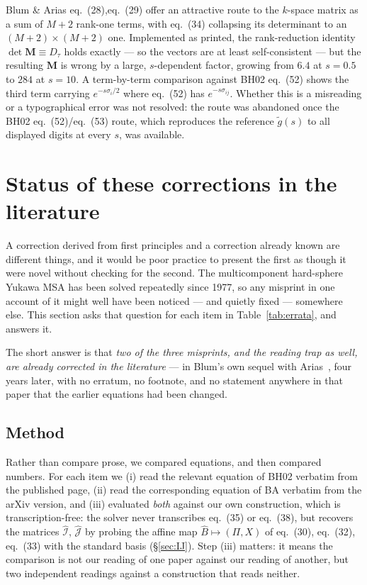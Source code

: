 \documentclass[11pt,a4paper]{article}
\newcommand{\eqBH}[1]{eq.~(#1)}
\begin{document}
Blum \& Arias \eqBH{28},\eqBH{29} offer an attractive route to the $k$-space
matrix as a sum of $M+2$ rank-one terms, with \eqBH{34} collapsing its
determinant to an $(M{+}2)\times(M{+}2)$ one. Implemented as printed, the
rank-reduction identity $\det\bm M\equiv D_\tau$ holds exactly --- so the
vectors are at least self-consistent --- but the resulting $\bm M$ is wrong by
a large, $s$-dependent factor, growing from $6.4$ at $s=0.5$ to $284$ at
$s=10$. A term-by-term comparison against BH02 \eqBH{52} shows the third term
carrying $e^{-s\sigma_i/2}$ where \eqBH{52} has $e^{-s\sigma_{ij}}$. Whether
this is a misreading or a typographical error was not resolved: the route was
abandoned once the BH02 \eqBH{52}/\eqBH{53} route, which reproduces the
reference $\tilde g(s)$ to all displayed digits at every $s$, was available.

\section{Status of these corrections in the literature}
\label{sec:literature}

A correction derived from first principles and a correction already known are
different things, and it would be poor practice to present the first as though
it were novel without checking for the second. The multicomponent hard-sphere
Yukawa MSA has been solved repeatedly since 1977, so any misprint in one
account of it might well have been noticed --- and quietly fixed --- somewhere
else. This section asks that question for each item in
Table~\ref{tab:errata}, and answers it.

The short answer is that \emph{two of the three misprints, and the reading trap
as well, are already corrected in the literature} --- in Blum's own sequel with
Arias~\cite{BlumArias}, four years later, with no erratum, no footnote, and no
statement anywhere in that paper that the earlier equations had been changed.

\subsection{Method}

Rather than compare prose, we compared equations, and then compared numbers.
For each item we (i) read the relevant equation of BH02 verbatim from the
published page, (ii) read the corresponding equation of BA verbatim from the
arXiv version, and (iii) evaluated \emph{both} against our own construction,
which is transcription-free: the solver never transcribes \eqBH{35} or
\eqBH{38}, but recovers the matrices $\hat{\mathcal I}$, $\hat{\mathcal J}$ by
probing the affine map $\hat B\mapsto(\Pi,X)$ of \eqBH{30}, \eqBH{32},
\eqBH{33} with the standard basis (\S\ref{sec:IJ}). Step (iii) matters:
it means the comparison is not our reading of one paper against our reading of
another, but two independent readings against a construction that reads
neither.
\end{document}
